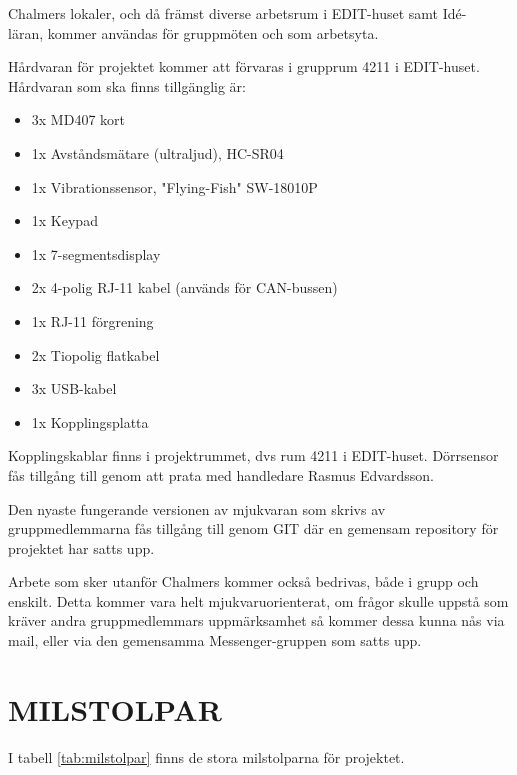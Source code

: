 \documentclass[a4paper]{article}
\begin{document}
Chalmers lokaler, och då främst diverse arbetsrum i EDIT-huset samt Idé-\\läran, kommer användas för gruppmöten och som arbetsyta.

Hårdvaran för projektet kommer att förvaras i grupprum 4211 i EDIT-huset. Hårdvaran som ska finns tillgänglig är:
\begin{itemize}
    \item 3x MD407 kort
    \item 1x Avståndsmätare (ultraljud), HC-SR04
    \item 1x Vibrationssensor, "Flying-Fish" SW-18010P
    \item 1x Keypad
    \item 1x 7-segmentsdisplay
    \item 2x 4-polig RJ-11 kabel (används för CAN-bussen)
    \item 1x RJ-11 förgrening
    \item 2x Tiopolig flatkabel
    \item 3x USB-kabel
    \item 1x Kopplingsplatta
\end{itemize}

Kopplingskablar finns i projektrummet, dvs rum 4211 i EDIT-huset. Dörrsensor fås tillgång till genom att prata med handledare Rasmus Edvardsson.

Den nyaste fungerande versionen av mjukvaran som skrivs av gruppmedlemmarna fås tillgång till genom GIT där en gemensam repository för projektet har satts upp.

Arbete som sker utanför Chalmers kommer också bedrivas, både i grupp och enskilt. Detta kommer vara helt mjukvaruorienterat, om frågor skulle uppstå som kräver andra gruppmedlemmars uppmärksamhet så kommer dessa kunna nås via mail, eller via den gemensamma Messenger-gruppen som satts upp.

\section{MILSTOLPAR}
\label{sec:milstolpar}

I tabell \ref{tab:milstolpar} finns de stora milstolparna för projektet.
\end{document}
